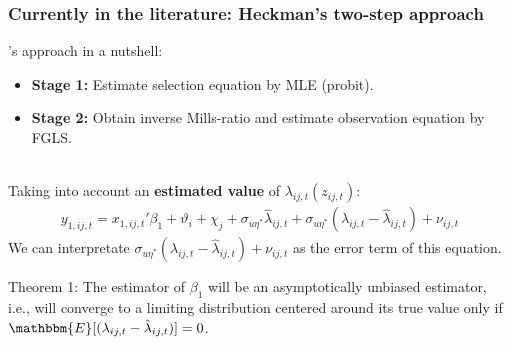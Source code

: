 \begin{frame}
    \frametitle{Currently in the literature: Heckman's two-step approach}
    \cite{heckman1979sample}'s approach in a nutshell:
    \begin{itemize}
        \item \textbf{Stage 1:} Estimate selection equation by MLE (probit).
        \item \textbf{Stage 2:} Obtain inverse Mills-ratio and estimate observation equation by FGLS. \\~\\
    \end{itemize}  \pause
    Taking into account an \textbf{estimated value} of $\lambda_{ij,t}(z_{ij,t})$:
    \begin{align*}
        y_{1,ij,t} = x_{1,ij,t}'\beta_1 + \vartheta_i + \chi_j + \sigma_{u\eta^*} \hat{\lambda}_{ij,t} + \sigma_{u\eta^*} ({\lambda}_{ij,t} - \hat{\lambda}_{ij,t}) + \nu_{ij,t}
    \end{align*}
    We can interpretate $\sigma_{u\eta^*} ({\lambda}_{ij,t} - \hat{\lambda}_{ij,t}) + \nu_{ij,t}$ as the error term of this equation. \pause
    \begin{block}{Theorem 1:}
        The estimator of $\beta_1$ will be an asymptotically unbiased estimator, i.e., will converge to a limiting distribution centered around its true value only if $\mathbbm{E} [ ({\lambda}_{ij,t} - \hat{\lambda}_{ij,t}) ] = 0$.
    \end{block} 

    \hyperlink{Heckman}{}
\end{frame}